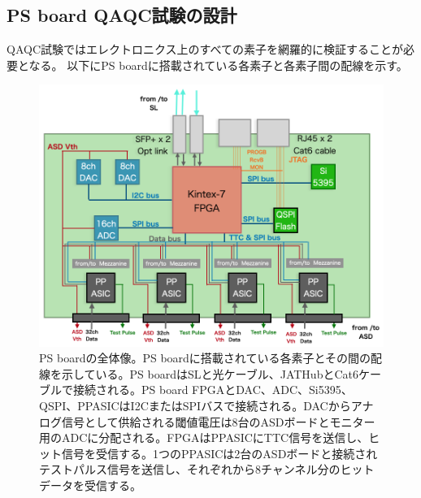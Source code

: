 \subsection{PS board QAQC試験の設計}
\label{subsec_QAQCdesign}
QAQC試験ではエレクトロニクス上のすべての素子を網羅的に検証することが必要となる。
以下にPS boardに搭載されている各素子と各素子間の配線を示す。

\begin{figure} 
\centering
\includegraphics[width=14cm]{fig/PSBoverall.png}
\caption[PSboardの全体像]{PS boardの全体像。PS boardに搭載されている各素子とその間の配線を示している。PS boardはSLと光ケーブル、JATHubとCat6ケーブルで接続される。PS board FPGAとDAC、ADC、Si5395、QSPI、PPASICはI2CまたはSPIバスで接続される。DACからアナログ信号として供給される閾値電圧は8台のASDボードとモニター用のADCに分配される。FPGAはPPASICにTTC信号を送信し、ヒット信号を受信する。1つのPPASICは2台のASDボードと接続されテストパルス信号を送信し、それぞれから8チャンネル分のヒットデータを受信する。}
\label{PSBconcept}
\end{figure}

\baselineskip

